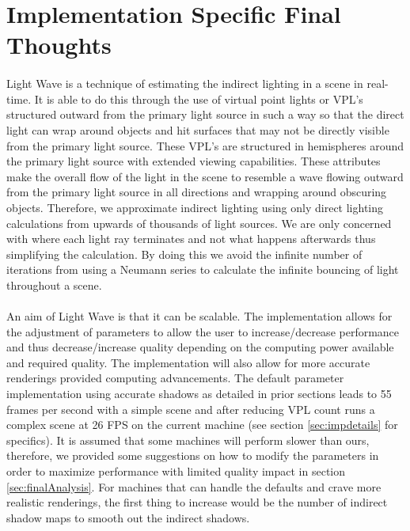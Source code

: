 \section{Implementation Specific Final Thoughts}
\paragraph{}
Light Wave is a technique of estimating the indirect lighting in a scene in real-time.  It is able to do this through the use of virtual point lights or VPL's structured outward from the primary light source in such a way so that the direct light can wrap around objects and hit surfaces that may not be directly visible from the primary light source.  These VPL's are structured in hemispheres around the primary light source with extended viewing capabilities.  These attributes make the overall flow of the light in the scene to resemble a wave flowing outward from the primary light source in all directions and wrapping around obscuring objects.  Therefore, we approximate indirect lighting using only direct lighting calculations from upwards of thousands of light sources.  We are only concerned with where each light ray terminates and not what happens afterwards thus simplifying the calculation.  By doing this we avoid the infinite number of iterations from using a Neumann series to calculate the infinite bouncing of light throughout a scene.

\paragraph{}
An aim of Light Wave is that it can be scalable.  The implementation allows for the adjustment of parameters to allow the user to increase/decrease performance and thus decrease/increase quality depending on the computing power available and required quality.  The implementation will also allow for more accurate renderings provided computing advancements.  The default parameter implementation using accurate shadows as detailed in prior sections leads to 55 frames per second with a simple scene and after reducing VPL count runs a complex scene at 26 FPS on the current machine (see section \ref{sec:impdetails} for specifics).  It is assumed that some machines will perform slower than ours, therefore, we provided some suggestions on how to modify the parameters in order to maximize performance with limited quality impact in section \ref{sec:finalAnalysis}.  For machines that can handle the defaults and crave more realistic renderings, the first thing to increase would be the number of indirect shadow maps to smooth out the indirect shadows.

